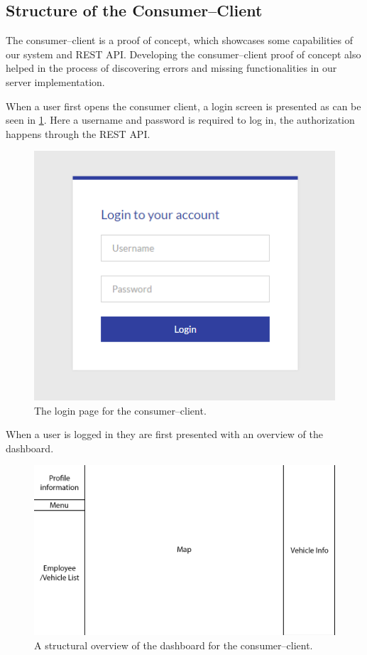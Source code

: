 \subsection{Structure of the Consumer--Client}\label{ssec:consumer_client_structure}
The consumer--client is a proof of concept, which showcases some capabilities of our system and REST API.
Developing the consumer--client proof of concept also helped in the process of discovering errors and missing functionalities in our server implementation.

When a user first opens the consumer client, a login screen is presented as can be seen in \cref{fig:ConsumerClientLogin}.
Here a username and password is required to log in, the authorization happens through the REST \ac{API}.
\begin{figure}[h]
    \centering
    \includegraphics[scale=0.5]{img/ConsumerClientLogin.png}
    \caption{The login page for the consumer--client.}
    \label{fig:ConsumerClientLogin}
\end{figure}

When a user is logged in they are first presented with an overview of the dashboard.

\begin{figure}[h]
    \centering
    \includegraphics[scale=0.15]{img/ConsumerClientWText.png}
    \caption{A structural overview of the dashboard for the consumer--client.}
    \label{fig:ConsumerClientLayout}
\end{figure}

